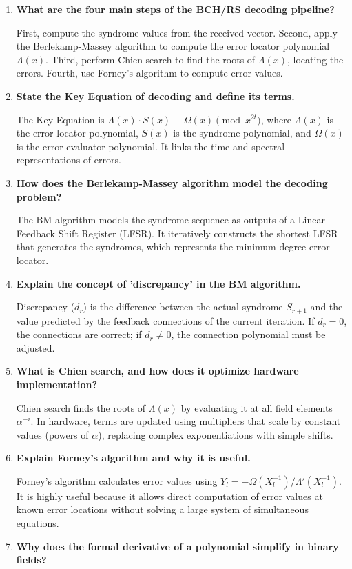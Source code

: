 \documentclass[12pt,a4paper]{article}
\newcommand{\Q}[1]{\textbf{#1}\par\noindent\ignorespaces}
\begin{document}
\newpage

\begin{tcolorbox}[exambox, title={\textbf{Frequently Asked / Viva Questions}}]
\begin{enumerate}[topsep=0pt, label=\textbf{Q\arabic*.}, itemsep=5pt]
  \item \Q{What are the four main steps of the BCH/RS decoding pipeline?}
    First, compute the syndrome values from the received vector. Second, apply the Berlekamp-Massey algorithm to compute the error locator polynomial $\Lambda(x)$. Third, perform Chien search to find the roots of $\Lambda(x)$, locating the errors. Fourth, use Forney's algorithm to compute error values.
  \item \Q{State the Key Equation of decoding and define its terms.}
    The Key Equation is $\Lambda(x) \cdot S(x) \equiv \Omega(x) \pmod{x^{2t}}$, where $\Lambda(x)$ is the error locator polynomial, $S(x)$ is the syndrome polynomial, and $\Omega(x)$ is the error evaluator polynomial. It links the time and spectral representations of errors.
  \item \Q{How does the Berlekamp-Massey algorithm model the decoding problem?}
    The BM algorithm models the syndrome sequence as outputs of a Linear Feedback Shift Register (LFSR). It iteratively constructs the shortest LFSR that generates the syndromes, which represents the minimum-degree error locator.
  \item \Q{Explain the concept of 'discrepancy' in the BM algorithm.}
    Discrepancy ($d_r$) is the difference between the actual syndrome $S_{r+1}$ and the value predicted by the feedback connections of the current iteration. If $d_r = 0$, the connections are correct; if $d_r \neq 0$, the connection polynomial must be adjusted.
  \item \Q{What is Chien search, and how does it optimize hardware implementation?}
    Chien search finds the roots of $\Lambda(x)$ by evaluating it at all field elements $\alpha^{-i}$. In hardware, terms are updated using multipliers that scale by constant values (powers of $\alpha$), replacing complex exponentiations with simple shifts.
  \item \Q{Explain Forney's algorithm and why it is useful.}
    Forney's algorithm calculates error values using $Y_l = -\Omega(X_l^{-1})/\Lambda'(X_l^{-1})$. It is highly useful because it allows direct computation of error values at known error locations without solving a large system of simultaneous equations.
  \item \Q{Why does the formal derivative of a polynomial simplify in binary fields?}

\end{enumerate}
\end{tcolorbox}
\end{document}
